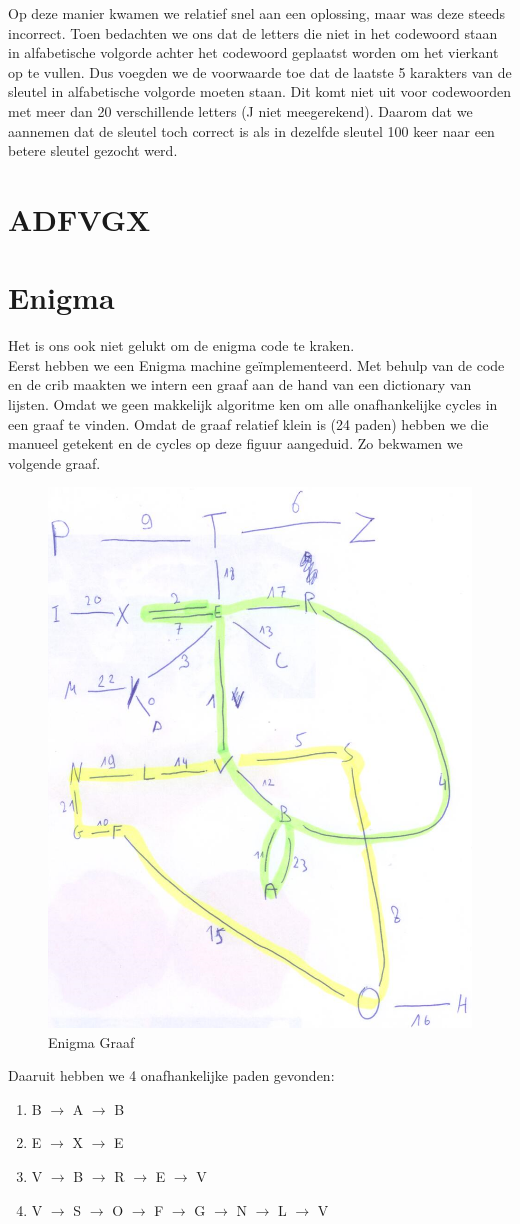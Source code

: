 \documentclass[fleqn]{article}
\begin{document}
	Op deze manier kwamen we relatief snel aan een oplossing, maar was deze steeds incorrect. Toen bedachten we ons dat de letters die niet in het codewoord staan in alfabetische volgorde achter het codewoord geplaatst worden om het vierkant op te vullen. Dus voegden we de voorwaarde toe dat de laatste 5 karakters van de sleutel in alfabetische volgorde moeten staan. Dit komt niet uit voor codewoorden met meer dan 20 verschillende letters (J niet meegerekend). Daarom dat we aannemen dat de sleutel toch correct is als in dezelfde sleutel 100 keer naar een betere sleutel gezocht werd.
	\section{ADFVGX}
	\section{Enigma}
	Het is ons ook niet gelukt om de enigma code te kraken.\\
	Eerst hebben we een Enigma machine ge\"{i}mplementeerd. Met behulp van de code en de crib maakten we intern een graaf aan de hand van een dictionary van lijsten. Omdat we geen makkelijk algoritme ken om alle onafhankelijke cycles in een graaf te vinden. Omdat de graaf relatief klein is (24 paden) hebben we die manueel getekent en de cycles op deze figuur aangeduid. Zo bekwamen we volgende graaf. 
	\begin{figure}[h!]
		\centering
		\includegraphics[width=0.5\linewidth]{Enigma}
		\caption[]{Enigma Graaf}
		\label{fig:enigma}
	\end{figure}

	Daaruit hebben we 4 onafhankelijke paden gevonden:
	\begin{enumerate}
		\item B $\rightarrow$ A $\rightarrow$ B
		\item E $\rightarrow$ X $\rightarrow$ E
		\item V $\rightarrow$ B $\rightarrow$ R $\rightarrow$ E $\rightarrow$ V
		\item V $\rightarrow$ S $\rightarrow$ O $\rightarrow$ F $\rightarrow$ G $\rightarrow$ N $\rightarrow$ L $\rightarrow$ V
	\end{enumerate}
\end{document}
